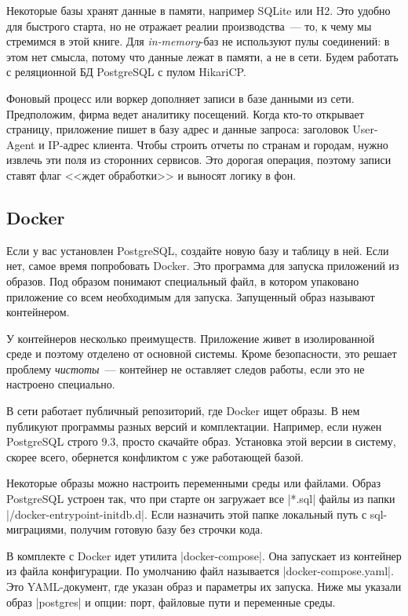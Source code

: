 Некоторые базы хранят данные в памяти, например SQLite или H2. Это удобно для
быстрого старта, но не отражает реалии производства~--- то, к чему мы стремимся
в этой книге. Для \emph{in-memory}-баз не используют пулы соединений: в этом нет
смысла, потому что данные лежат в памяти, а не в сети. Будем работать с
реляционной БД PostgreSQL с пулом HikariCP.

Фоновый процесс или воркер дополняет записи в базе данными из сети. Предположим,
фирма ведет аналитику посещений. Когда кто-то открывает страницу, приложение
пишет в базу адрес и данные запроса: заголовок User-Agent и IP-адрес
клиента. Чтобы строить отчеты по странам и городам, нужно извлечь эти поля из
сторонних сервисов. Это дорогая операция, поэтому записи ставят флаг <<ждет
обработки>> и выносят логику в фон.

\subsection{Docker}

Если у вас установлен PostgreSQL, создайте новую базу и таблицу в ней. Если нет,
самое время попробовать Docker. Это программа для запуска приложений из
образов. Под образом понимают специальный файл, в котором упаковано приложение
со всем необходимым для запуска. Запущенный образ называют контейнером.

У контейнеров несколько преимуществ. Приложение живет в изолированной среде и
поэтому отделено от основной системы. Кроме безопасности, это решает проблему
\emph{чистоты}~--- контейнер не оставляет следов работы, если это не настроено
специально.

В сети работает публичный репозиторий, где Docker ищет образы. В нем публикуют
программы разных версий и комплектации. Например, если нужен PostgreSQL строго
9.3, просто скачайте образ. Установка этой версии в систему, скорее всего,
обернется конфликтом с уже работающей базой.

Некоторые образы можно настроить переменными среды или файлами. Образ PostgreSQL
устроен так, что при старте он загружает все \spverb|*.sql| файлы из папки
\spverb|/docker-entrypoint-initdb.d|. Если назначить этой папке локальный путь с
sql-миграциями, получим готовую базу без строчки кода.

В комплекте с Docker идет утилита \spverb|docker-compose|. Она запускает из
контейнер из файла конфигурации. По умолчанию файл называется
\spverb|docker-compose.yaml|. Это YAML-документ, где указан образ и параметры их
запуска. Ниже мы указали образ \spverb|postgres| и опции: порт, файловые пути и
переменные среды.

